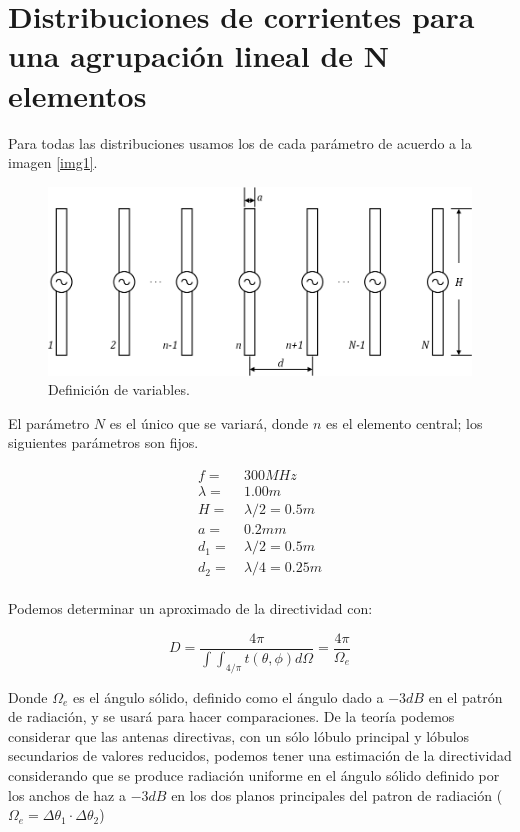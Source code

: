 \documentclass[11pt]{report}
\begin{document}
\newpage


\chapter{Distribuciones de corrientes para una agrupación lineal de N elementos}

Para todas las distribuciones usamos los de cada parámetro de acuerdo a la imagen \eqref{img1}.



\begin{figure}[h!]
	\centering
	\includegraphics[scale=1]{IMAGENES/img1}
	\caption{Definición de variables.}
	\label{img1} %
\end{figure}

El parámetro $N$ es el único que se variará, donde $n$ es el elemento central; los siguientes parámetros son fijos.

\begin{align*}
	f =			& \ 300MHz \\
	\lambda = 	& \ 1.00m \\
	H =			& \ \lambda/2 = 0.5m \\
	a =			& \ 0.2mm \\
	d_1 = & \ \lambda / 2 = 0.5m \\
	d_2 = & \ \lambda / 4 = 0.25m \\
\end{align*}

Podemos determinar un aproximado de la directividad con:

\begin{equation}
	D = \frac{4\pi}{\int\int_{4/\pi} t(\theta,\phi)d\Omega}=\frac{4\pi}{\Omega_e}
\end{equation}

Donde $\Omega_e$ es el ángulo sólido, definido como el ángulo dado a $-3dB$ en el patrón de radiación, y se usará para hacer comparaciones. De la teoría podemos considerar que las antenas directivas, con un sólo lóbulo principal y lóbulos secundarios de valores reducidos, podemos tener una estimación de la directividad considerando que se produce radiación uniforme en el ángulo sólido definido por los anchos de haz a $-3dB$ en los dos planos principales del patron de radiación ($\Omega_e = \Delta\theta_1 \cdot \Delta\theta_2$)
\end{document}
